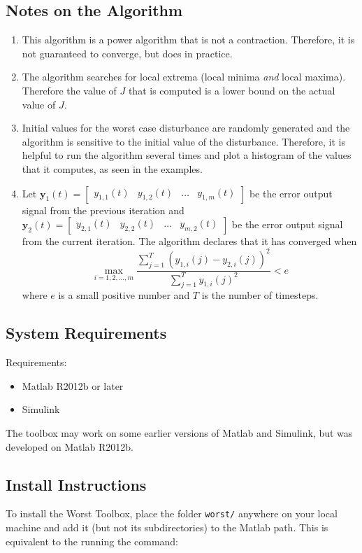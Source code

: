 \documentclass{article}
\begin{document}
\subsection{Notes on the Algorithm} \label{algnotes}
\begin{enumerate}
\item This algorithm is a power algorithm that is not a contraction. Therefore,
it is not guaranteed to converge, but does in practice.

\item The algorithm searches for local extrema (local minima \emph{and} local
maxima). Therefore the value of $J$ that
is computed is a lower bound on the actual value of $J$.

\item Initial values for the worst case disturbance are randomly generated and
the algorithm is sensitive to the initial value of the disturbance. Therefore,
it is helpful to run the algorithm several times and plot a histogram of the
values that it computes, as seen in the examples.

\item Let $\mathbf{y}_1(t) = \begin{bmatrix}y_{1,1} (t) & y_{1,2}(t) & \dots &
y_{1,m}(t)
\end{bmatrix}$ be the error output signal from the previous iteration and $\mathbf{y}_2(t) = \begin{bmatrix} y_{2,1}(t) & y_{2,2}(t) &
\dots & y_{m,2}(t) \end{bmatrix}$ be the error output signal from the current
iteration. The algorithm declares that it has converged when
\[ \max_{i = 1,2,\dots,m} \frac{\sum_{j=1}^T (y_{1,i}(j) - y_{2,i}(j))^2}{\sum_{j=1}^T
y_{1,i}(j)^2 } < e \]
where $e$ is a small positive number and $T$ is the number of timesteps.

\end{enumerate}


\subsection{System Requirements}
Requirements:
\begin{itemize}
\item Matlab R2012b or later
\item Simulink
\end{itemize}
The toolbox may work on some earlier versions of Matlab and Simulink, but was
developed on Matlab R2012b.


\subsection{Install Instructions}
To install the Worst Toolbox, place the folder \texttt{worst/} anywhere on your
local machine and add it (but not its subdirectories) to the Matlab path. This
is equivalent to the running the command:
\end{document}
